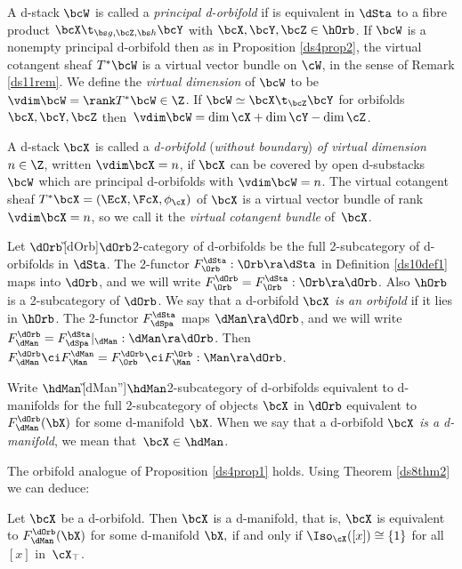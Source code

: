 \documentclass{article}
\begin{document}
\begin{dfn} A d-stack $\bcW$ is called a {\it principal
d-orbifold\/} if is equivalent in $\dSta$ to
a fibre product $\bcX\t_{\bs g,\bcZ,\bs h}\bcY$ with
$\bcX,\bcY,\bcZ\in\hOrb$. If $\bcW$ is a nonempty principal
d-orbifold then as in Proposition \ref{ds4prop2}, the virtual
cotangent sheaf $T^*\bcW$ is a virtual vector bundle on $\cW$, in
the sense of Remark \ref{ds11rem}. We define the {\it virtual
dimension\/} of $\bcW$ to be $\vdim\bcW=\rank T^*\bcW\in\Z$. If
$\bcW\simeq\bcX\t_{\bcZ}\bcY$ for orbifolds $\bcX,\bcY,\bcZ$
then~$\vdim\bcW=\dim\cX+\dim\cY-\dim\cZ$.

A d-stack $\bcX$ is called a {\it d-orbifold\/} ({\it without
boundary\/}) {\it of virtual dimension\/} $n\in\Z$, written $\vdim\bcX=n$, if $\bcX$ can be covered
by open d-substacks $\bcW$ which are principal d-orbifolds with
$\vdim\bcW=n$. The virtual cotangent sheaf
$T^*\bcX=(\EcX,\FcX,\phi_\cX)$ of $\bcX$ is a virtual vector bundle
of rank $\vdim\bcX=n$, so we call it the {\it virtual cotangent
bundle\/} of~$\bcX$.

Let $\dOrb$\G[dOrb]{$\dOrb$}{2-category of d-orbifolds} be the full
2-subcategory of d-orbifolds in $\dSta$. The 2-functor
$F_\Orb^\dSta:\Orb\ra\dSta$ in Definition \ref{ds10def1} maps into
$\dOrb$, and we will write $F_\Orb^\dOrb=F_\Orb^\dSta:
\Orb\ra\dOrb$. Also $\hOrb$ is a 2-subcategory of $\dOrb$. We say
that a d-orbifold $\bcX$ {\it is an orbifold\/} if it lies in
$\hOrb$. The 2-functor $F_\dSpa^\dSta$
maps $\dMan\ra\dOrb$, and we will write $F_\dMan^\dOrb=F_\dSpa^\dSta
\vert_{\dMan}:\dMan\ra\dOrb$. Then~$F_\dMan^\dOrb\ci F_\Man^\dMan=
F_\Orb^\dOrb\ci F_\Man^\Orb:\Man\ra\dOrb$.

Write $\hdMan$\G[dMan'']{$\hdMan$}{2-subcategory of d-orbifolds
equivalent to d-manifolds} for the full 2-subcategory of objects
$\bcX$ in $\dOrb$ equivalent to $F_\dMan^\dOrb(\bX)$ for some
d-manifold $\bX$. When we say that a d-orbifold $\bcX$ {\it is a
d-manifold}, we mean
that~$\bcX\in\hdMan$.
\label{ds11def1}
\end{dfn}

The orbifold analogue of Proposition \ref{ds4prop1} holds. Using
Theorem \ref{ds8thm2} we can deduce:

\begin{lem} Let\/ $\bcX$ be a d-orbifold. Then $\bcX$ is a d-manifold,
that is, $\bcX$ is equivalent to\/ $F_\dMan^\dOrb(\bX)$ for some
d-manifold\/ $\bX,$ if and only if\/
$\Iso_\cX([x])\cong\{1\}$ for all\/ $[x]$ in\/~$\cX_\top$.
\label{ds11lem}
\end{lem}
\end{document}
